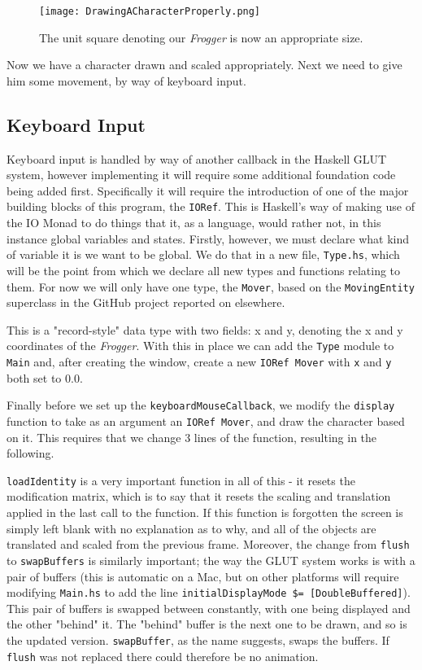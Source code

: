 \documentclass[12pt, a4paper]{report}
\begin{document}
\begin{figure}[ht]
  \centering
  \caption{The unit square denoting our \textit{Frogger} is now an appropriate size.}
  \texttt{[image: DrawingACharacterProperly.png]}
  \label{fig:drawingacharacterproperly}
\end{figure}

Now we have a character drawn and scaled appropriately.
Next we need to give him some movement, by way of keyboard input.

\subsection{Keyboard Input}

Keyboard input is handled by way of another callback in the Haskell GLUT system, however implementing it will require some additional foundation code being added first.
Specifically it will require the introduction of one of the major building blocks of this program, the \verb|IORef|.
This is Haskell's way of making use of the IO Monad to do things that it, as a language, would rather not, in this instance global variables and states.
Firstly, however, we must declare what kind of variable it is we want to be global.
We do that in a new file, \verb|Type.hs|, which will be the point from which we declare all new types and functions relating to them.
For now we will only have one type, the \verb|Mover|, based on the \verb|MovingEntity| superclass in the GitHub project reported on elsewhere.

This is a "record-style" data type with two fields: x and y, denoting the x and y coordinates of the \textit{Frogger}.
With this in place we can add the \verb|Type| module to \verb|Main| and, after creating the window, create a new \verb|IORef Mover| with \verb|x| and \verb|y| both set to 0.0.

Finally before we set up the \verb|keyboardMouseCallback|, we modify the \verb|display| function to take as an argument an \verb|IORef Mover|, and draw the character based on it.
This requires that we change 3 lines of the function, resulting in the following.

\verb|loadIdentity| is a very important function in all of this - it resets the modification matrix, which is to say that it resets the scaling and translation applied in the last call to the function.
If this function is forgotten the screen is simply left blank with no explanation as to why, and all of the objects are translated and scaled from the previous frame.
Moreover, the change from \verb|flush| to \verb|swapBuffers| is similarly important; the way the GLUT system works is with a pair of buffers (this is automatic on a Mac, but on other platforms will require modifying \verb|Main.hs| to add the line \verb|initialDisplayMode $= [DoubleBuffered]|).
This pair of buffers is swapped between constantly, with one being displayed and the other "behind" it.
The "behind" buffer is the next one to be drawn, and so is the updated version.
\verb|swapBuffer|, as the name suggests, swaps the buffers.
If \verb|flush| was not replaced there could therefore be no animation.
\end{document}
